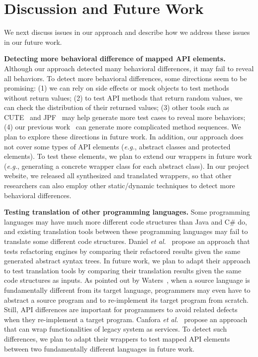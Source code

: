 

\section{Discussion and Future Work}
\label{sec:discuss}

We next discuss issues in our approach and describe how we address
these issues in our future work.

\textbf{Detecting more behavioral difference of mapped API elements.} Although our approach detected many behavioral differences, it may fail to reveal all behaviors. To detect more behavioral differences, some directions seem to be promising: (1) we can rely on side effects or  mock objects to test methods without return values; (2) to test API methods that return random values, we can check the distribution of their returned values; (3) other tools such as CUTE~\cite{koushik:cute} and JPF~\cite{visser2003mcp} may help generate more test cases to reveal more behaviors; (4) our previous work~\cite{thummalapenta09:mseqgen} can generate more complicated method sequences. We plan to explore these directions in future work. In addition, our approach does not cover some types of API elements (\emph{e.g.}, abstract classes and protected elements). To test these elements, we plan to extend our wrappers in future work (\emph{e.g.}, generating a concrete wrapper class for each abstract class). In our project website, we released all synthesized and translated wrappers, so that other researchers can also employ other static/dynamic techniques to detect more behavioral differences.

\textbf{Testing translation of other programming languages.} Some programming languages may have much more different code structures than Java and C\# do, and existing translation tools between these programming languages may fail to translate some different code structures. Daniel \emph{et al.}~\cite{daniel2007automated} propose an approach that tests refactoring engines by comparing their refactored results given the same generated abstract syntax trees. In future work, we plan to adapt their approach to test translation tools by comparing their translation results given the same code structures as inputs. As pointed out by Waters~\cite{waters1988program}, when a source language is fundamentally different from its target language, programmers may even have to abstract a source program and to re-implement its target program from scratch. Still, API differences are important for programmers to avoid related defects when they re-implement a target program. Canfora \emph{et al.}~\cite{CanforaFFT08} propose an approach that can wrap functionalities of legacy system as services. To detect such differences, we plan to adapt their wrappers to test mapped API elements between two fundamentally different languages in future work.

